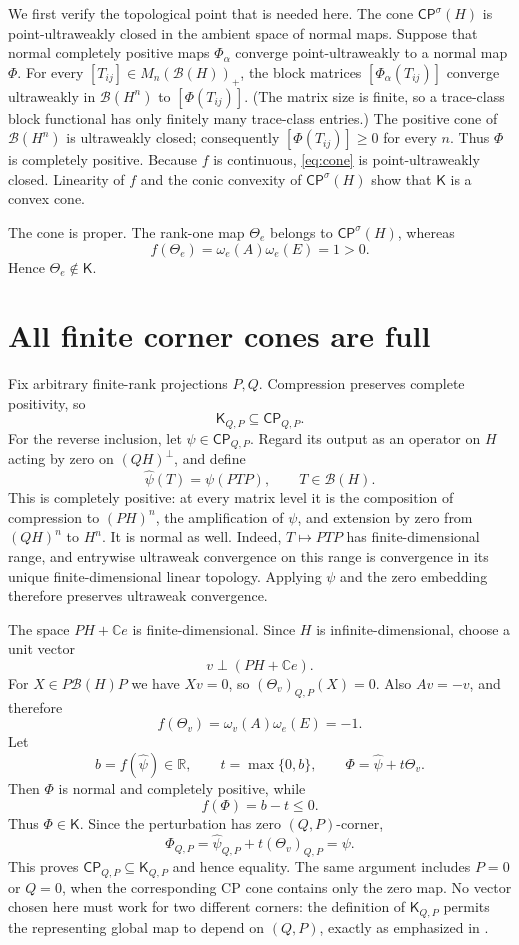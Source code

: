 \documentclass[11pt]{article}
\newcommand{\B}{\mathcal B}
\newcommand{\CP}{\mathsf{CP}}
\newcommand{\Kcone}{\mathsf K}
\begin{document}
We first verify the topological point that is needed here.  The cone
$\CP^\sigma(H)$ is point-ultraweakly closed in the ambient space of normal
maps.  Suppose that normal completely positive maps $\Phi_\alpha$ converge
point-ultraweakly to a normal map $\Phi$.  For every
$[T_{ij}]\in M_n(\B(H))_+$, the block matrices
$[\Phi_\alpha(T_{ij})]$ converge ultraweakly in $\B(H^n)$ to
$[\Phi(T_{ij})]$.  (The matrix size is finite, so a trace-class block
functional has only finitely many trace-class entries.)  The positive cone of
$\B(H^n)$ is ultraweakly closed; consequently
$[\Phi(T_{ij})]\geq0$ for every $n$.  Thus $\Phi$ is completely positive.
Because $f$ is continuous, \eqref{eq:cone} is point-ultraweakly closed.
Linearity of $f$ and the conic convexity of $\CP^\sigma(H)$ show that
$\Kcone$ is a convex cone.

The cone is proper.  The rank-one map $\Theta_e$ belongs to
$\CP^\sigma(H)$, whereas
\[
 f(\Theta_e)=\omega_e(A)\omega_e(E)=1>0.
\]
Hence $\Theta_e\notin\Kcone$.

\section{All finite corner cones are full}

Fix arbitrary finite-rank projections $P,Q$.  Compression preserves complete
positivity, so
\[
 \Kcone_{Q,P}\subseteq\CP_{Q,P}.
\]
For the reverse inclusion, let $\psi\in\CP_{Q,P}$.  Regard its output as an
operator on $H$ acting by zero on $(QH)^\perp$, and define
\[
 \widehat\psi(T)=\psi(PTP),
 \qquad T\in\B(H).
\]
This is completely positive: at every matrix level it is the composition of
compression to $(PH)^n$, the amplification of $\psi$, and extension by zero
from $(QH)^n$ to $H^n$.  It is normal as well.  Indeed, $T\mapsto PTP$ has
finite-dimensional range, and entrywise ultraweak convergence on this range
is convergence in its unique finite-dimensional linear topology.  Applying
$\psi$ and the zero embedding therefore preserves ultraweak convergence.

The space $PH+\mathbb Ce$ is finite-dimensional.  Since $H$ is
infinite-dimensional, choose a unit vector
\[
 v\perp(PH+\mathbb Ce).
\]
For $X\in P\B(H)P$ we have $Xv=0$, so
$(\Theta_v)_{Q,P}(X)=0$.  Also $Av=-v$, and therefore
\[
 f(\Theta_v)=\omega_v(A)\omega_e(E)=-1.
\]
Let
\[
 b=f(\widehat\psi)\in\mathbb R,
 \qquad t=\max\{0,b\},
 \qquad \Phi=\widehat\psi+t\Theta_v.
\]
Then $\Phi$ is normal and completely positive, while
\[
 f(\Phi)=b-t\leq0.
\]
Thus $\Phi\in\Kcone$.  Since the perturbation has zero $(Q,P)$-corner,
\[
 \Phi_{Q,P}=\widehat\psi_{Q,P}+t(\Theta_v)_{Q,P}=\psi.
\]
This proves $\CP_{Q,P}\subseteq\Kcone_{Q,P}$ and hence equality.  The same
argument includes $P=0$ or $Q=0$, when the corresponding CP cone contains
only the zero map.  No vector chosen here must work for two different
corners: the definition of $\Kcone_{Q,P}$ permits the representing global map
to depend on $(Q,P)$, exactly as emphasized in
\cite[Remark~5.4]{KianKittaneh2026}.
\end{document}
